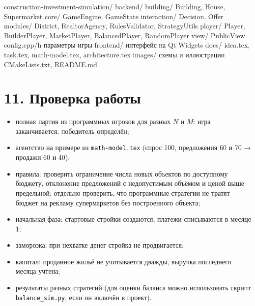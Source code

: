 \documentclass[
]{article}
\newenvironment{Shaded}{\begin{snugshade}}{\end{snugshade}}
\newcommand{\NormalTok}[1]{#1}
\providecommand{\tightlist}{%
  \setlength{\itemsep}{0pt}\setlength{\parskip}{0pt}}
\begin{document}
\begin{Shaded}
\begin{Highlighting}[]
\NormalTok{construction{-}investment{-}simulation/}
\NormalTok{  backend/}
\NormalTok{    building/      Building, House, Supermarket}
\NormalTok{    core/          GameEngine, GameState}
\NormalTok{    interaction/   Decision, Offer}
\NormalTok{    modules/       District, RealtorAgency, RulesValidator, StrategyUtils}
\NormalTok{    player/        Player, BuilderPlayer, MarketPlayer, BalancedPlayer, RandomPlayer}
\NormalTok{    view/          PublicView}
\NormalTok{    config.cpp/h   параметры игры}
\NormalTok{  frontend/        интерфейс на Qt Widgets}
\NormalTok{  docs/}
\NormalTok{    idea.tex, task.tex, math{-}model.tex, architecture.tex}
\NormalTok{    images/        схемы и иллюстрации}
\NormalTok{  CMakeLists.txt, README.md}
\end{Highlighting}
\end{Shaded}

\section{11. Проверка
работы}\label{ux43fux440ux43eux432ux435ux440ux43aux430-ux440ux430ux431ux43eux442ux44b}

\begin{itemize}
\tightlist
\item
  полная партия из программных игроков для разных \(N\) и \(M\): игра
  заканчивается, победитель определён;
\item
  агентство на примере из \texttt{math-model.tex} (спрос 100, предложения
  60 и 70 → продажи 60 и 40);
\item
  правила: проверить ограничение числа новых объектов по доступному
  бюджету, отклонение предложений с недопустимым объёмом и ценой выше
  предельной; отдельно проверить, что программные стратегии не тратят
  бюджет на рекламу супермаркетов без построенного объекта;
\item
  начальная фаза: стартовые стройки создаются, платежи списываются в
  месяце 1;
\item
  заморозка: при нехватке денег стройка не продвигается;
\item
  капитал: проданное жильё не учитывается дважды, выручка последнего
  месяца учтена;
\item
  результаты разных стратегий (для оценки баланса можно использовать
  скрипт \texttt{balance\_sim.py}, если он включён в проект).
\end{itemize}
\end{document}
